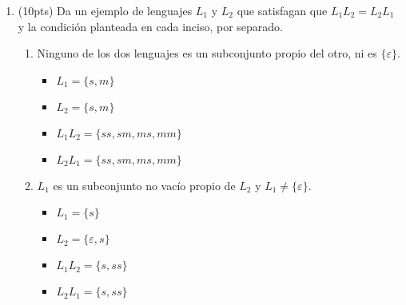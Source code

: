\documentclass{article}
\begin{document}
\begin{enumerate}
    $\boxed{\Rightarrow} (L^+)^* \subseteq (L^*)^+$

    Sea $w \in (L^+)^*$. Por definición de $*$, $w \in \bigcup_{i \geq 0} (L^+)^i$, es decir, $w \in (L^+)^0 \cup (L^+)^1 \cup (L^+)^2 \cup ...$

    Lo anterior es igual a $w \in \{\varepsilon\} \cup (L^+)^1 \cup (L^+)^2 \cup ...$, y a su vez $w \in \{\varepsilon\} \cup (L^+)^+.$
    Ademas sabemos que $(L^+)^+ = L^+$, asi que $w \in \{\varepsilon\} \cup (L^+)$, y por definición de *, $w \in L^*$

    Por otro lado, para que $w \in (L^*)^+$, se debe cumplir que $w \in \bigcup_{i > 0}(L^*)^i$, es decir, $w \in (L^*)^1 \cup (L^*)^2 \cup (L^*)^3 \cup ...$ Pero sabemos que $w \in L^* = (L^*)^1$, y por definición de unión, $w \in \bigcup_{i > 0}(L^*)^i$, por tanto $w \in (L^*)^+$
    
    $\boxed{\Rightarrow} (L^*)^+ \subseteq (L^+)^*$

    Sea $w \in (L^*)^+$. Por definición de $+$, $w \in \bigcup_{i > 0}(L^*)^i$, es decir, $w \in (L^*)^1 \cup (L^*)^2 \cup (L^*)^3 \cup ...$ Sin perdida de generalidad, supongamos que $w \in (L^*)^i$, con $i > 0$ \\
    Por otro lado, para que $w \in (L^+)^*$, debe ocurrir que $w \in \bigcup_{i \geq 0}(L^+)^i = (L^+)^0 \cup (L^+)^1 \cup (L^+)^2 \cup ... =\{\varepsilon\} \cup L^+ \cup (L^+)^2 \cup ... = L^* \cup (L^+)^2 \cup ...$ Pero sabemos que $w \in (L^*)^i = L^*$ (demostración hecha en clase), entonces $w$ est\'a en algún uniendo, y por tanto $w \in \bigcup_{i \geq 0} (L^+)^i = (L^+)^*$ \\
    $\therefore ~(L^+)^* =  (L^*)^+$
    
    \item (10pts) Da un ejemplo de lenguajes $L_1$ y $L_2$ que satisfagan que $L_1L_2 = L_2L_1$ y la condición planteada en cada inciso, por separado.
    \begin{enumerate}
        \item Ninguno de los dos lenguajes es un subconjunto propio del otro, ni es $\{\varepsilon\}$.
        \begin{itemize}
            \item $L_1 = \{s, m\}$
            \item $L_2 = \{s, m\}$
            \item $L_1L_2 = \{ss, sm, ms, mm\}$
            \item $L_2L_1 = \{ss, sm, ms, mm\}$
        \end{itemize}
        \item $L_1$ es un subconjunto no vacío propio de $L_2$ y $L_1 \neq \{\varepsilon\}$.
        \begin{itemize}
            \item $L_1 = \{s\}$
            \item $L_2 = \{\varepsilon, s\}$
            \item $L_1L_2 = \{s, ss\}$
            \item $L_2L_1 = \{s, ss\}$
        \end{itemize}
    \end{enumerate}
    

\end{enumerate}
\end{document}
